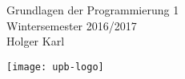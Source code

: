 \documentclass[a4paper,11pt]{memoir}
\begin{document}
\thispagestyle{empty}
\begin{titlingpage}
  \centering 
  \vspace*{5cm}
  {\huge Grundlagen der Programmierung 1}
  \\[2ex]
  {\large Wintersemester 2016/2017}
  \\[2ex]
  {\large Holger Karl}
  \vfill
  \begin{center}
    \texttt{[image: upb-logo]}
  \end{center}
\end{titlingpage}
\pagestyle{companion}


\cleardoublepage
\tableofcontents

\listoffigures
\renewcommand{\listtheoremname}{Liste von Definitionen u.ä.}
\listoftheorems 
\newpage
{}
%
% 
% 


\end{document}
